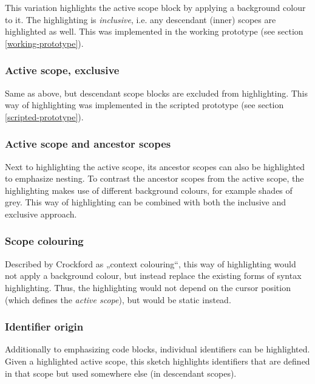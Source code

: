 This variation highlights the active scope block by applying a
background colour to it. The highlighting is \emph{inclusive}, i.e. any
descendant (inner) scopes are highlighted as well. This was implemented
in the working prototype (see section \ref{working-prototype}).

\subsubsection{Active scope, exclusive}\label{active-scope-exclusive}

Same as above, but descendant scope blocks are excluded from
highlighting. This way of highlighting was implemented in the scripted
prototype (see section \ref{scripted-prototype}).

\subsubsection{Active scope and ancestor
scopes}\label{active-scope-and-ancestor-scopes}

Next to highlighting the active scope, its ancestor scopes can also be
highlighted to emphasize nesting. To contrast the ancestor scopes from
the active scope, the highlighting makes use of different background
colours, for example shades of grey. This way of highlighting can be
combined with both the inclusive and exclusive approach.

\subsubsection{Scope colouring}\label{scope-colouring}

Described by Crockford \citeyear{crockford} as „context colouring“, this
way of highlighting would not apply a background colour, but instead
replace the existing forms of syntax highlighting. Thus, the
highlighting would not depend on the cursor position (which defines the
\emph{active scope}), but would be static instead.

\subsubsection{Identifier origin}\label{identifier-origin}

Additionally to emphasizing code blocks, individual identifiers can be
highlighted. Given a highlighted active scope, this sketch highlights
identifiers that are defined in that scope but used somewhere else (in
descendant scopes).


